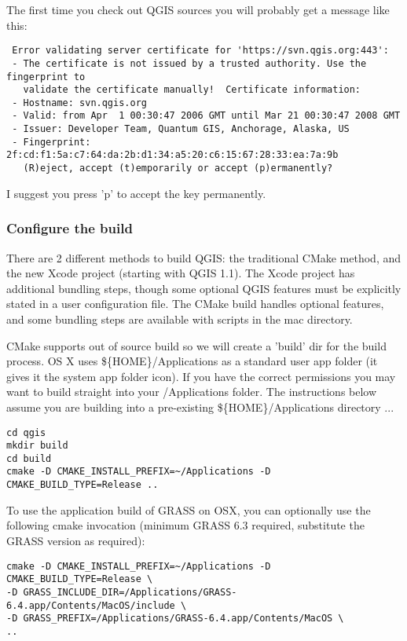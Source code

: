 The first time you check out QGIS sources you will probably get a message like
this:

\begin{verbatim}
 Error validating server certificate for 'https://svn.qgis.org:443':
 - The certificate is not issued by a trusted authority. Use the fingerprint to
   validate the certificate manually!  Certificate information:
 - Hostname: svn.qgis.org
 - Valid: from Apr  1 00:30:47 2006 GMT until Mar 21 00:30:47 2008 GMT
 - Issuer: Developer Team, Quantum GIS, Anchorage, Alaska, US
 - Fingerprint: 2f:cd:f1:5a:c7:64:da:2b:d1:34:a5:20:c6:15:67:28:33:ea:7a:9b
   (R)eject, accept (t)emporarily or accept (p)ermanently?  
\end{verbatim}

I suggest you press 'p' to accept the key permanently.

\hypertarget{toc36}{}
\subsubsection{Configure the build}
There are 2 different methods to build QGIS: the traditional CMake method,
and the new Xcode project (starting with QGIS 1.1). The Xcode project has
additional bundling steps, though some optional QGIS features must be explicitly
stated in a user configuration file. The CMake build handles optional features,
and some bundling steps are available with scripts in the mac directory.

\hypertarget{toc37}{}
CMake supports out of source build so we will create a 'build' dir for the
build process. OS X uses \$\{HOME\}/Applications as a standard user app folder (it gives it the system app folder icon).
If you have the correct permissions you may want to build
straight into your /Applications folder. The instructions below assume you are
building into a pre-existing \$\{HOME\}/Applications directory ...

\begin{verbatim}
cd qgis
mkdir build
cd build
cmake -D CMAKE_INSTALL_PREFIX=~/Applications -D CMAKE_BUILD_TYPE=Release ..
\end{verbatim}

To use the application build of GRASS on OSX, you can optionally use the
following cmake invocation (minimum GRASS 6.3 required, substitute the GRASS
version as required):

\begin{verbatim}
cmake -D CMAKE_INSTALL_PREFIX=~/Applications -D CMAKE_BUILD_TYPE=Release \
-D GRASS_INCLUDE_DIR=/Applications/GRASS-6.4.app/Contents/MacOS/include \
-D GRASS_PREFIX=/Applications/GRASS-6.4.app/Contents/MacOS \
..
\end{verbatim}

